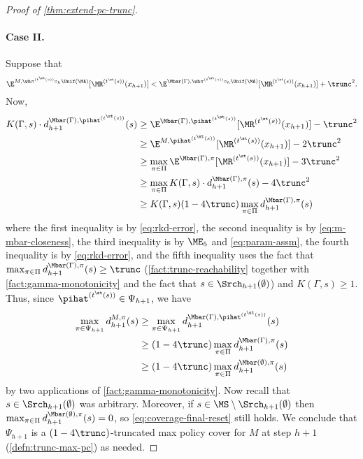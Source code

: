 \begin{proof}[Proof of \cref{thm:extend-pc-trunc}]
\paragraph{Case II.} Suppose that
\begin{equation} \E^{M,\wh\pi^{(t^\st(s))}\circ_h\Unif(\MA)}[\MR^{(t^\st(s))}(x_{h+1})] < \E^{\Mbar(\Gamma),\wh\pi^{(t^\st(s))}\circ_h\Unif(\MA)}[\MR^{(t^\st(s))}(x_{h+1})] + \trunc^2.\label{eq:m-mbar-closeness}\end{equation}
Now, 
\begin{align*}
K(\Gamma, s) \cdot d^{\Mbar(\Gamma), \pihat^{(t^\st(s))}}_{h+1}(s) 
&\geq \E^{\Mbar(\Gamma),\pihat^{(t^\st(s))}}[\MR^{(t^\st(s))}(x_{h+1})] - \trunc^2 \\ 
&\geq \E^{M,\pihat^{(t^\st(s))}}[\MR^{(t^\st(s))}(x_{h+1})] - 2\trunc^2 \\ 
&\geq \max_{\pi\in\Pi} \E^{\Mbar(\Gamma),\pi}[\MR^{(t^\st(s))}(x_{h+1})] - 3\trunc^2 \\ 
&\geq \max_{\pi\in\Pi} K(\Gamma,s) \cdot d^{\Mbar(\Gamma),\pi}_{h+1}(s) -  4\trunc^2 \\ 
&\geq K(\Gamma,s)(1-4\trunc) \max_{\pi\in\Pi} d^{\Mbar(\Gamma),\pi}_{h+1}(s)
\end{align*}
where the first inequality is by \cref{eq:rkd-error}, the second inequality is by \cref{eq:m-mbar-closeness}, the third inequality is by $\ME_5$ and \cref{eq:param-assm}, the fourth inequality is by \cref{eq:rkd-error}, and the fifth inequality uses the fact that $\max_{\pi\in\Pi} d^{\Mbar(\Gamma),\pi}_{h+1}(s) \geq \trunc$ (\cref{fact:trunc-reachability} together with \cref{fact:gamma-monotonicity} and the fact that $s \in \Srch_{h+1}(\emptyset)$) and $K(\Gamma,s) \geq 1$. Thus, since $\pihat^{(t^\st(s))} \in \Psi_{h+1}$, we have 
\begin{align}
\max_{\pi\in\Psi_{h+1}} d^{M,\pi}_{h+1}(s)
&\geq \max_{\pi\in\Psi_{h+1}} d^{\Mbar(\Gamma),\pihat^{(t^\st(s))}}_{h+1}(s) \nonumber\\ 
&\geq (1-4\trunc)\max_{\pi\in\Pi} d^{\Mbar(\Gamma),\pi}_{h+1}(s) \nonumber\\ 
&\geq (1-4\trunc)\max_{\pi\in\Pi} d^{\Mbar(\emptyset),\pi}_{h+1}(s)
\label{eq:coverage-final-reset}
\end{align}
by two applications of \cref{fact:gamma-monotonicity}. Now recall that $s \in \Srch_{h+1}(\emptyset)$ was arbitrary. Moreover, if $s \in \MS\setminus \Srch_{h+1}(\emptyset)$ then $\max_{\pi\in\Pi} d^{\Mbar(\emptyset),\pi}_{h+1}(s) = 0$, so \cref{eq:coverage-final-reset} still holds. We conclude that $\Psi_{h+1}$ is a $(1-4\trunc)$-truncated max policy cover for $M$ at step $h+1$ (\cref{defn:trunc-max-pc}) as needed.
\end{proof}

